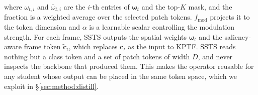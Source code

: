 where $\omega_{t,i}$ and $\bar{\omega}_{t,i}$ are the $i$-th entries of $\boldsymbol{\omega}_t$ and
the top-$K$ mask, and the fraction is a weighted average over the selected patch tokens.
$f_{\mathrm{mod}}$ projects it to the
token dimension and $\alpha$ is a learnable scalar controlling the modulation strength.
For each frame, SSTS outputs the spatial weights $\boldsymbol{\omega}_t$ and the
saliency-aware frame token $\tilde{\mathbf{c}}_t$, which replaces $\mathbf{c}_t$ as the input to
KPTF.
SSTS reads nothing but a class token and a set of patch tokens of width $D$, and never inspects the
backbone that produced them.
This makes the operator reusable for any student whose output can be placed in the same token space,
which we exploit in \S\ref{sec:method:distill}.

